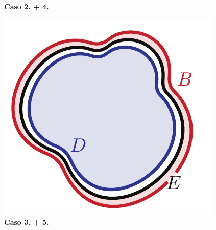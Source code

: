 \begin{theorema}
\begin{enumerate}
\begin{minipage}{0.4\textwidth}
\begin{center}
		\textbf{Caso 2. + 4.}
	\end{center}
\end{minipage}
\begin{minipage}{0.5\textwidth}
	\begin{center}
			\includegraphics[trim=0cm 0cm 0cm 0cm, clip, scale=0.7]{images/regolarita2}\\
			\textbf{Caso 3. + 5.}
	\end{center}
\end{minipage}
	\end{enumerate}
\end{theorema}
